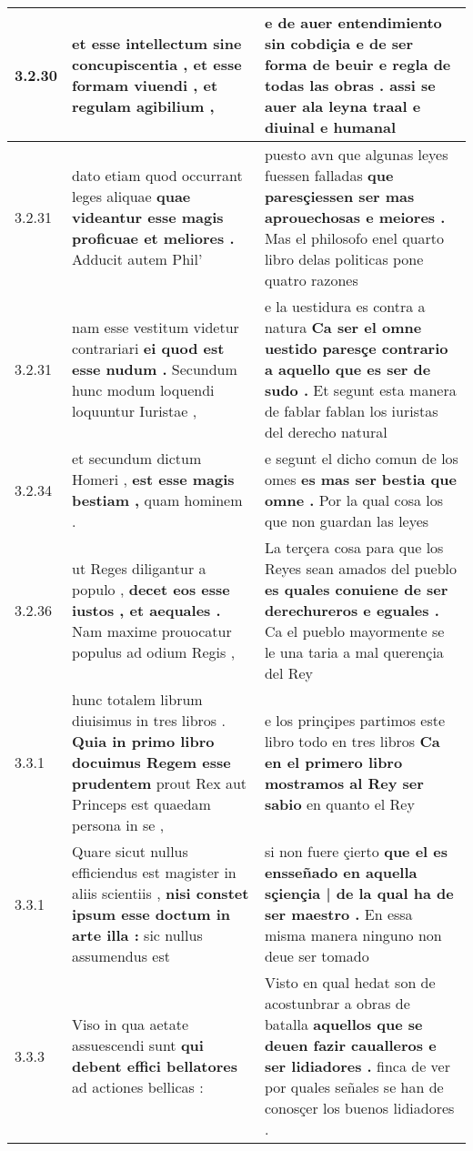 \begin{tabular}{|p{1cm}|p{6.5cm}|p{6.5cm}|}
3.2.30 & et esse intellectum sine concupiscentia , \textbf{ et esse formam viuendi , } et regulam agibilium , & e de auer entendimiento sin cobdiçia \textbf{ e de ser forma de beuir e regla de todas las obras . } assi se auer ala leyna traal e diuinal e humanal \\\hline
3.2.31 & dato etiam quod occurrant leges aliquae \textbf{ quae videantur esse magis proficuae et meliores . } Adducit autem Phil’ & puesto avn que algunas leyes fuessen falladas \textbf{ que paresçiessen ser mas aprouechosas e meiores . } Mas el philosofo enel quarto libro delas politicas pone quatro razones \\\hline
3.2.31 & nam esse vestitum videtur contrariari \textbf{ ei quod est esse nudum . } Secundum hunc modum loquendi loquuntur Iuristae , & e la uestidura es contra a natura \textbf{ Ca ser el omne uestido paresçe contrario a aquello que es ser de sudo . } Et segunt esta manera de fablar fablan los iuristas del derecho natural \\\hline
3.2.34 & et secundum dictum Homeri , \textbf{ est esse magis bestiam , } quam hominem . & e segunt el dicho comun de los omes \textbf{ es mas ser bestia que omne . } Por la qual cosa los que non guardan las leyes \\\hline
3.2.36 & ut Reges diligantur a populo , \textbf{ decet eos esse iustos , et aequales . } Nam maxime prouocatur populus ad odium Regis , & La terçera cosa para que los Reyes sean amados del pueblo \textbf{ es quales conuiene de ser derechureros e eguales . } Ca el pueblo mayormente se le una taria a mal querençia del Rey \\\hline
3.3.1 & hunc totalem librum diuisimus in tres libros . \textbf{ Quia in primo libro docuimus Regem esse prudentem } prout Rex aut Princeps est quaedam persona in se , & e los prinçipes partimos este libro todo en tres libros \textbf{ Ca en el primero libro mostramos al Rey ser sabio } en quanto el Rey \\\hline
3.3.1 & Quare sicut nullus efficiendus est magister in aliis scientiis , \textbf{ nisi constet ipsum esse doctum in arte illa : } sic nullus assumendus est & si non fuere çierto \textbf{ que el es ensseñado en aquella sçiençia | de la qual ha de ser maestro . } En essa misma manera ninguno non deue ser tomado \\\hline
3.3.3 & Viso in qua aetate assuescendi sunt \textbf{ qui debent effici bellatores } ad actiones bellicas : & Visto en qual hedat son de acostunbrar a obras de batalla \textbf{ aquellos que se deuen fazir caualleros e ser lidiadores . } finca de ver por quales señales se han de conosçer los buenos lidiadores . \\\hline

\end{tabular}
